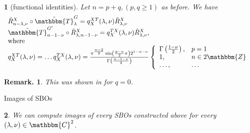 \documentclass[notes,notheorems]{beamer}
\newtheorem{theorem}{\translate{Theorem}}[section]
\newtheorem{theorem}{\translate{Theorem}}
\theoremstyle{definition}
\theoremstyle{example}
\theoremstyle{plain}
\theoremstyle{mystyle}
\newtheorem*{remark}{Remark.}
\begin{document}
\begin{frame}
  \begin{figure}[H]
    \centering
    \begin{subfigure}[t]{0.3\textwidth}
    \end{subfigure}
    ~ %
    \begin{subfigure}[t]{0.3\textwidth}
    \end{subfigure}
    \end{figure}
    \vspace{-1em}
	\begin{theorem}[functional identities]
	Let $n = p +
	q, (p, q \geqslant 1)$ as before. We have
	\begin{equation*}
		\begin{array}[]{l}
\tilde{R}_{n - \lambda, \nu}^X \circ
\tilde{\mathbbm{T}}_{\lambda}^G = q_X^{X T} (\lambda, \nu)
\tilde{R}^X_{\lambda, \nu} \\
\tilde{\mathbbm{T}}_{n - 1 - \nu}^{G'} \circ
\tilde{R}_{\lambda, n - 1 - \nu}^X = q_X^{T X} (\lambda, \nu)
\tilde{R}_{\lambda, \nu}^X,\\
	\mbox{where}\\
q_X^{X T} (\lambda, \nu) = \ldots
q_X^{T X} (\lambda, \nu) = \frac{\pi^{\frac{n -
2}{2}} \sin \left( \frac{p - \nu}{2} \pi \right) 2^{1 - n - \nu}}{\Gamma
\left( \frac{n - 1 - \nu}{2} \right)} \left\{ \begin{array}{ll}
  \Gamma \left( \frac{1 - \nu}{2} \right), & p = 1\\
  1, & n \in 2\mathbbm{Z}\\
  \ldots, & \ldots
\end{array} \right.
		\end{array}
	\end{equation*}
	\end{theorem}
	\begin{remark}
		This was shown in
		\cite{kobayashi2015symmetry} for $q = 0$.
	\end{remark}
\end{frame}
\begin{frame}{Images of SBOs}
	\begin{theorem}
		We can compute images
		of every SBOs constructed above for every $(\lambda, \nu) \in \mathbbm{C}^2$.
	\end{theorem}
\end{frame}
\end{document}
